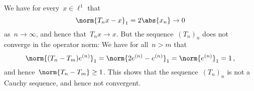 We have for every~$x \in \ell^1$ that
\[
      \norm{T_n x - x}_1
  =   2 \abs{x_n}
  \to 0
\]
as~$n \to \infty$, and hence that~$T_n x \to x$.
But the sequence~$(T_n)_n$ does not converge in the operator norm:
We have for all~$n > m$ that
\[
    \norm{ (T_n - T_m) e^{(n)} }_1
  = \norm{ 2 e^{(n)} - e^{(n)} }_1
  = \norm{ e^{(n)} }_1
  = 1 \,,
\]
and hence~$\norm{ T_n - T_m } \geq 1$.
This shows that the sequence~$(T_n)_n$ is not a Cauchy sequence, and hence not convergent.
